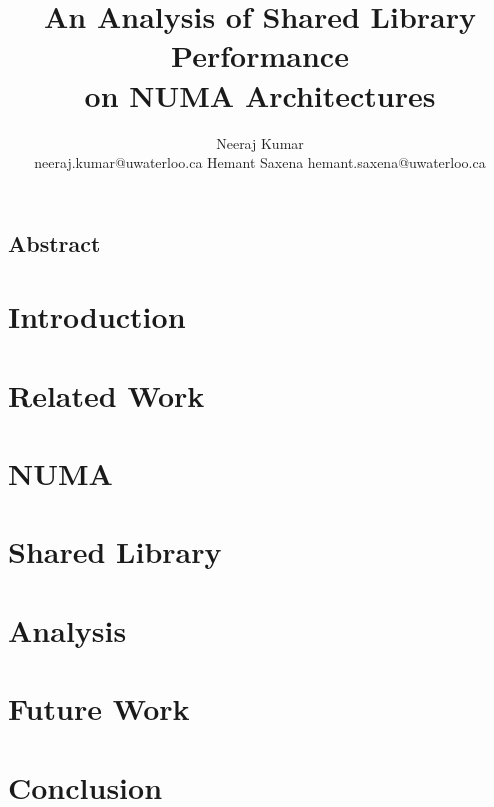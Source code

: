 \documentclass{acm_proc_article-sp}
\title{An Analysis of Shared Library Performance \\ on NUMA Architectures}
\author{
Neeraj Kumar\\
neeraj.kumar@uwaterloo.ca
\alignauthor
Hemant Saxena
hemant.saxena@uwaterloo.ca
}
\begin{document}
\maketitle

\subsection*{Abstract}


\section{Introduction}


\section{Related Work}


\section{NUMA}


\section{Shared Library}


\section{Analysis}


\section{Future Work}


\section{Conclusion}




\end{document}
